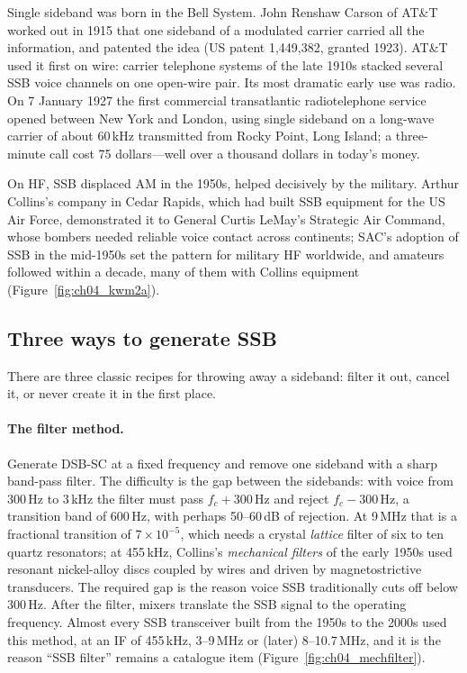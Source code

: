 \begin{history}
Single sideband was born in the Bell System. John Renshaw Carson of AT\&T worked out in 1915 that one
sideband of a modulated carrier carried all the information, and patented the idea (US patent
1,449,382, granted 1923). AT\&T used it first on wire: carrier telephone systems of the late 1910s
stacked several SSB voice channels on one open-wire pair. Its most dramatic early use was radio. On
7 January 1927 the first commercial transatlantic radiotelephone service opened between New York and
London, using single sideband on a long-wave carrier of about 60\,kHz transmitted from Rocky Point,
Long Island; a three-minute call cost 75 dollars---well over a thousand dollars in today's money.

On HF, SSB displaced AM in the 1950s, helped decisively by the military. Arthur Collins's company in
Cedar Rapids, which had built SSB equipment for the US Air Force, demonstrated it to General Curtis
LeMay's Strategic Air Command, whose bombers needed reliable voice contact across continents; SAC's
adoption of SSB in the mid-1950s set the pattern for military HF worldwide, and amateurs followed within
a decade, many of them with Collins equipment (Figure~\ref{fig:ch04_kwm2a}).
\end{history}


\subsection{Three ways to generate SSB}
\label{sec:ch04:ssbgen}

There are three classic recipes for throwing away a sideband: filter it out, cancel it, or never create
it in the first place.

\paragraph{The filter method.} Generate DSB-SC at a fixed frequency and remove one sideband with a sharp
band-pass filter. The difficulty is the gap between the sidebands: with voice from 300\,Hz to 3\,kHz the
filter must pass $f_c+300$\,Hz and reject $f_c-300$\,Hz, a transition band of 600\,Hz, with perhaps
50--60\,dB of rejection. At 9\,MHz that is a fractional transition of $7\times10^{-5}$, which needs a
crystal \emph{lattice} filter of six to ten quartz resonators; at 455\,kHz, Collins's \emph{mechanical
filters} of the early 1950s used resonant nickel-alloy discs coupled by wires and driven by
magnetostrictive transducers. The required gap is the reason voice SSB traditionally cuts off below
300\,Hz. After the filter, mixers translate the SSB signal to the operating frequency. Almost every SSB
transceiver built from the 1950s to the 2000s used this method, at an IF of 455\,kHz, 3--9\,MHz or
(later) 8--10.7\,MHz, and it is the reason ``SSB filter'' remains a catalogue item (Figure~\ref{fig:ch04_mechfilter}).

